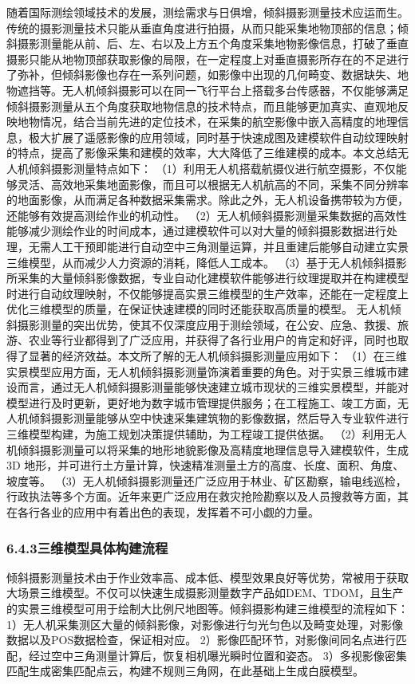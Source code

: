 随着国际测绘领域技术的发展，测绘需求与日俱增，倾斜摄影测量技术应运而生。传统的摄影测量技术只能从垂直角度进行拍摄，从而只能采集地物顶部的信息；倾斜摄影测量能从前、后、左、右以及上方五个角度采集地物影像信息，打破了垂直摄影只能从地物顶部获取影像的局限，在一定程度上对垂直摄影所存在的不足进行了弥补，但倾斜影像也存在一系列问题，如影像中出现的几何畸变、数据缺失、地物遮挡等。无人机倾斜摄影可以在同一飞行平台上搭载多台传感器，不仅能够满足倾斜摄影测量从五个角度获取地物信息的技术特点，而且能够更加真实、直观地反映地物情况，结合当前先进的定位技术，在采集的航空影像中嵌入高精度的地理信息，极大扩展了遥感影像的应用领域，同时基于快速成图及建模软件自动纹理映射的特点，提高了影像采集和建模的效率，大大降低了三维建模的成本。本文总结无人机倾斜摄影测量特点如下： （1）利用无人机搭载航摄仪进行航空摄影，不仅能够灵活、高效地采集地面影像，而且可以根据无人机航高的不同，采集不同分辨率的地面影像，从而满足各种数据采集需求。除此之外，无人机设备携带较为方便，还能够有效提高测绘作业的机动性。 （2）无人机倾斜摄影测量采集数据的高效性能够减少测绘作业的时间成本，通过建模软件可以对大量的倾斜摄影数据进行处理，无需人工干预即能进行自动空中三角测量运算，并且重建后能够自动建立实景三维模型，从而减少人力资源的消耗，降低人工成本。 （3）基于无人机倾斜摄影所采集的大量倾斜影像数据，专业自动化建模软件能够进行纹理提取并在构建模型时进行自动纹理映射，不仅能够提高实景三维模型的生产效率，还能在一定程度上优化三维模型的质量，在保证快速建模的同时还能获取高质量的模型。 无人机倾斜摄影测量的突出优势，使其不仅深度应用于测绘领域，在公安、应急、救援、旅游、农业等行业都得到了广泛应用，并获得了各行业用户的肯定和好评，同时也取得了显著的经济效益。本文所了解的无人机倾斜摄影测量应用如下： （1）在三维实景模型应用方面，无人机倾斜摄影测量饰演着重要的角色。对于实景三维城市建设而言，通过无人机倾斜摄影测量能够快速建立城市现状的三维实景模型，并能对模型进行及时更新，更好地为数字城市管理提供服务；在工程施工、竣工方面，无人机倾斜摄影测量能够从空中快速采集建筑物的影像数据，然后导入专业软件进行三维模型构建，为施工规划决策提供辅助，为工程竣工提供依据。 （2）利用无人机倾斜摄影测量可以将采集的地形地貌影像及高精度地理信息导入建模软件，生成 3D 地形，并可进行土方量计算，快速精准测量土方的高度、长度、面积、角度、坡度等。 （3）无人机倾斜摄影测量还广泛应用于林业、矿区勘察，输电线巡检，行政执法等多个方面。近年来更广泛应用在救灾抢险勘察以及人员搜救等方面，其在各行各业的应用中有着出色的表现，发挥着不可小觑的力量。 \subsubsection{6.4.3三维模型具体构建流程}\label{ux4e09ux7ef4ux6a21ux578bux5177ux4f53ux6784ux5efaux6d41ux7a0b} 倾斜摄影测量技术由于作业效率高、成本低、模型效果良好等优势，常被用于获取大场景三维模型。不仅可以快速生成摄影测量数字产品如DEM、TDOM，且生产的实景三维模型可用于绘制大比例尺地图等。倾斜摄影构建三维模型的流程如下： 1）无人机采集测区大量的倾斜影像，对影像进行匀光匀色以及畸变处理，对影像数据以及POS数据检查，保证相对应。 2）影像匹配环节，对影像间同名点进行匹配，经过空中三角测量计算后，恢复相机曝光瞬时位置和姿态。 3）多视影像密集匹配生成密集匹配点云，构建不规则三角网，在此基础上生成白膜模型。 